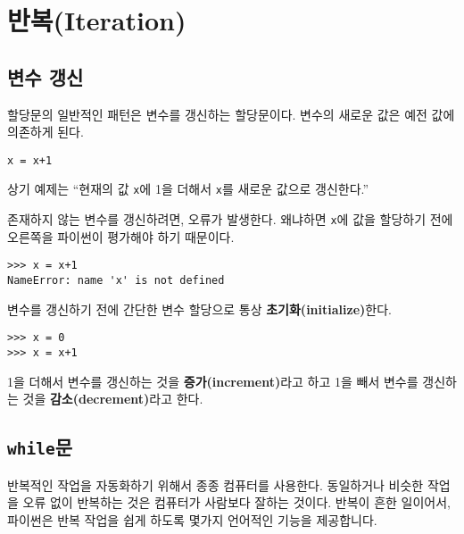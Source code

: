 
\chapter{반복(Iteration)}

\section{변수 갱신}
\label{update}


할당문의 일반적인 패턴은 변수를 갱신하는 할당문이다. 변수의 새로운 값은 예전 값에 의존하게 된다.

\beforeverb
\begin{verbatim}
x = x+1
\end{verbatim}
\afterverb
%

상기 예제는 ``현재의 값 {\tt x}에 1을 더해서 {\tt x}를 새로운 값으로 갱신한다.''

존재하지 않는 변수를 갱신하려면, 오류가 발생한다. 왜냐하면 {\tt x}에 값을 할당하기 전에 오른쪽을 파이썬이 평가해야 하기 때문이다.

\beforeverb
\begin{verbatim}
>>> x = x+1
NameError: name 'x' is not defined
\end{verbatim}
\afterverb
%

변수를 갱신하기 전에 간단한 변수 할당으로 통상 {\bf 초기화(initialize)}한다.


\beforeverb
\begin{verbatim}
>>> x = 0
>>> x = x+1
\end{verbatim}
\afterverb
%
1을 더해서 변수를 갱신하는 것을 {\bf 증가(increment)}라고 하고 1을 빼서 변수를 갱신하는 것을 {\bf 감소(decrement)}라고 한다.


\section{{\tt while}문}

반복적인 작업을 자동화하기 위해서 종종 컴퓨터를 사용한다. 동일하거나 비슷한 작업을 오류 없이 반복하는 것은 컴퓨터가 사람보다 잘하는 것이다.
반복이 흔한 일이어서, 파이썬은 반복 작업을 쉽게 하도록 몇가지 언어적인 기능을 제공합니다.

